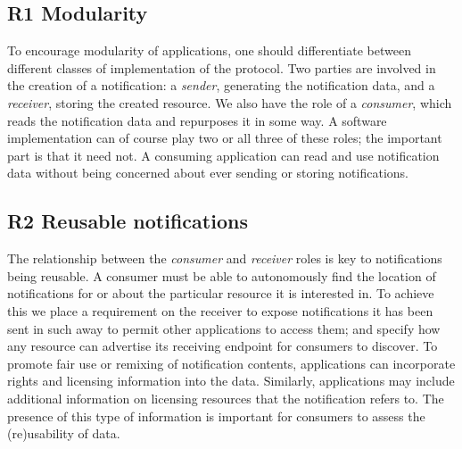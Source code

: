 \documentclass[a4paper]{llncs}
\begin{document}
                            
                                \subsection{R1 Modularity}
  \label{modularity}

                                
                                    
\par To encourage modularity of applications, one should differentiate between different classes of implementation of the protocol. Two parties are involved in the creation of a notification: a {\em sender}, generating the notification data, and a {\em receiver}, storing the created resource. We also have the role of a {\em consumer}, which reads the notification data and repurposes it in some way. A software implementation can of course play two or all three of these roles; the important part is that it need not. A consuming application can read and use notification data without being concerned about ever sending or storing notifications.
                                
                            

                            
                                \subsection{R2 Reusable notifications}
  \label{reusable-notifications}

                                
                                    
\par The relationship between the {\em consumer} and {\em receiver} roles is key to notifications being reusable. A consumer must be able to autonomously find the location of notifications for or about the particular resource it is interested in. To achieve this we place a requirement on the receiver to expose notifications it has been sent in such away to permit other applications to access them; and specify how any resource can advertise its receiving endpoint for consumers to discover. To promote fair use or remixing of notification contents, applications can incorporate rights and licensing information into the data. Similarly, applications may include additional information on licensing resources that the notification refers to. The presence of this type of information is important for consumers to assess the (re)usability of data.
                                
\end{document}
